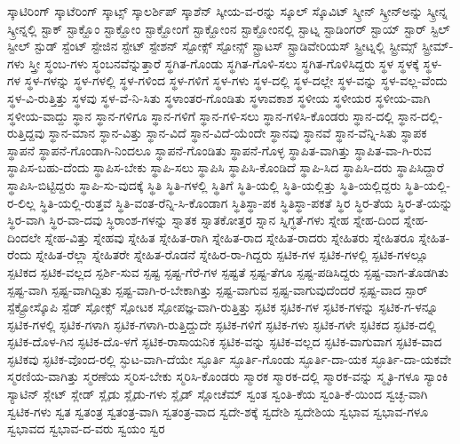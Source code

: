 {ಸ್ಕಾಟಿರಿಂಗ್
ಸ್ಕಾಟೆರಿಂಗ್
ಸ್ಕಾಟ್ಸ್
ಸ್ಕಾಲರ್ಶಿಪ್
ಸ್ಕಾಶೆನ್
ಸ್ಕೀಯ-ವ-ರನ್ನು
ಸ್ಕೂಲ್
ಸ್ಕೊವಿಟ್
ಸ್ಕ್ರೀನ್
ಸ್ಕ್ರೀನ್ಅನ್ನು
ಸ್ಕ್ರೀನ್ನ
ಸ್ಕ್ರೀನ್ನಲ್ಲಿ
ಸ್ಟಾಕ್
ಸ್ಟಾಕ್ಹೊಂ
ಸ್ಟಾಕ್ಹೋಂ
ಸ್ಟಾಕ್ಹೋಂಗೆ
ಸ್ಟಾಕ್ಹೋಂನ
ಸ್ಟಾಕ್ಹೋಂನಲ್ಲಿ
ಸ್ಟಾಟ್ನ
ಸ್ಟಾಡಿಂಗರ್
ಸ್ಟಾಯ್
ಸ್ಟಾರ್
ಸ್ಟಿಲ್
ಸ್ಟೀಲ್
ಸ್ಟುಡ್
ಸ್ಟೆಂಟ್
ಸ್ಟೇಜಿನ
ಸ್ಟೇಟ್
ಸ್ಟೇಶನ್
ಸ್ಟೋಕ್ಸ್
ಸ್ಟೋನ್ಸ್
ಸ್ಟ್ರಾಟಸ್
ಸ್ಟ್ರಾಡಿವೇರಿಯಸ್
ಸ್ಟ್ರೀಟ್ನಲ್ಲಿ
ಸ್ಟ್ರೀಮ್ಸ್
ಸ್ಟ್ರೀಮ್-ಗಳು
ಸ್ತ್ರೀ
ಸ್ಥಂಬ-ಗಳು
ಸ್ಥಂಬನವೆನ್ನುತ್ತಾರೆ
ಸ್ಥಗಿತ-ಗೊಂಡು
ಸ್ಥಗಿತ-ಗೊಳಿ-ಸಲು
ಸ್ಥಗಿತ-ಗೊಳಿಸಿದ್ದರು
ಸ್ಥಳ
ಸ್ಥಳಕ್ಕೆ
ಸ್ಥಳ-ಗಳ
ಸ್ಥಳ-ಗಳನ್ನು
ಸ್ಥಳ-ಗಳಲ್ಲಿ
ಸ್ಥಳ-ಗಳಿಂದ
ಸ್ಥಳ-ಗಳಿಗೆ
ಸ್ಥಳ-ಗಳು
ಸ್ಥಳ-ದಲ್ಲಿ
ಸ್ಥಳ-ದಲ್ಲೇ
ಸ್ಥಳ-ವನ್ನು
ಸ್ಥಳ-ವಲ್ಲ-ವೆಂದು
ಸ್ಥಳ-ವಿ-ರುತ್ತಿತ್ತು
ಸ್ಥಳವು
ಸ್ಥಳ-ವೆ-ನಿ-ಸಿತು
ಸ್ಥಳಾಂತರ-ಗೊಂಡಿತು
ಸ್ಥಳಾವಕಾಶ
ಸ್ಥಳೀಯ
ಸ್ಥಳೀಯರ
ಸ್ಥಳೀಯ-ವಾಗಿ
ಸ್ಥಳೀಯ-ವಾದ್ದು
ಸ್ಥಾನ
ಸ್ಥಾನ-ಗಳಿಗೂ
ಸ್ಥಾನ-ಗಳಿಗೆ
ಸ್ಥಾನ-ಗಳಿ-ಸಲು
ಸ್ಥಾನ-ಗಳಿಸಿ-ಕೊಂಡರು
ಸ್ಥಾನ-ದಲ್ಲಿ
ಸ್ಥಾನ-ದಲ್ಲಿ-ರುತ್ತಿದ್ದವು
ಸ್ಥಾನ-ಮಾನ
ಸ್ಥಾನ-ವಿತ್ತು
ಸ್ಥಾನ-ವಿದೆ
ಸ್ಥಾನ-ವಿದೆ-ಯೆಂದೇ
ಸ್ಥಾನವು
ಸ್ಥಾನವೆ
ಸ್ಥಾನ-ವೆನ್ನಿ-ಸಿತು
ಸ್ಥಾಪಕ
ಸ್ಥಾಪನೆ
ಸ್ಥಾಪನೆ-ಗೊಂಡಾಗಿ-ನಿಂದಲೂ
ಸ್ಥಾಪನೆ-ಗೊಂಡಿತು
ಸ್ಥಾಪನೆ-ಗೊಳ್ಳ
ಸ್ಥಾಪಿತ-ವಾಗಿತ್ತು
ಸ್ಥಾಪಿತ-ವಾ-ಗಿ-ರುವ
ಸ್ಥಾಪಿಸ-ಬಹು-ದೆಂದು
ಸ್ಥಾಪಿಸ-ಬೇಕು
ಸ್ಥಾಪಿ-ಸಲು
ಸ್ಥಾಪಿಸಿ
ಸ್ಥಾಪಿಸಿ-ಕೊಂಡಿದೆ
ಸ್ಥಾಪಿ-ಸಿದ
ಸ್ಥಾಪಿಸಿ-ದರು
ಸ್ಥಾಪಿಸಿದ್ದಾರೆ
ಸ್ಥಾಪಿಸಿ-ಬಿಟ್ಟಿದ್ದರು
ಸ್ಥಾಪಿ-ಸು-ವುದಕ್ಕೆ
ಸ್ಥಿತಿ
ಸ್ಥಿತಿ-ಗಳಲ್ಲಿ
ಸ್ಥಿತಿಗೆ
ಸ್ಥಿತಿ-ಯಲ್ಲಿ
ಸ್ಥಿತಿ-ಯಲ್ಲಿತ್ತು
ಸ್ಥಿತಿ-ಯಲ್ಲಿದ್ದರು
ಸ್ಥಿತಿ-ಯಲ್ಲಿ-ರ-ಲಿಲ್ಲ
ಸ್ಥಿತಿ-ಯಲ್ಲಿ-ರುತ್ತವೆ
ಸ್ಥಿತಿ-ವಂತ-ರೆನ್ನಿ-ಸಿ-ಕೊಂಡಾಗ
ಸ್ಥಿತಿಸ್ಥಾ-ಪಕ
ಸ್ಥಿತಿಸ್ಥಾ-ಪಕತೆ
ಸ್ಥಿರ
ಸ್ಥಿರ-ತೆಯ
ಸ್ಥಿರ-ತೆ-ಯನ್ನು
ಸ್ಥಿರ-ವಾಗಿ
ಸ್ಥಿರ-ವಾ-ದವು
ಸ್ಥಿರಾಂಶ-ಗಳನ್ನು
ಸ್ನಾತಕ
ಸ್ನಾತಕೋತ್ತರ
ಸ್ನಾನ
ಸ್ನಿಗ್ಧತೆ-ಗಳು
ಸ್ನೇಹ
ಸ್ನೇಹ-ದಿಂದ
ಸ್ನೇಹ-ದಿಂದಲೇ
ಸ್ನೇಹ-ವಿತ್ತು
ಸ್ನೇಹವು
ಸ್ನೇಹಿತ
ಸ್ನೇಹಿತ-ರಾಗಿ
ಸ್ನೇಹಿತ-ರಾದ
ಸ್ನೇಹಿತ-ರಾದರು
ಸ್ನೇಹಿತರು
ಸ್ನೇಹಿತರೂ
ಸ್ನೇಹಿತ-ರೆಂದು
ಸ್ನೇಹಿತ-ರೆಲ್ಲಾ
ಸ್ನೇಹಿತರೇ
ಸ್ನೇಹಿತ-ರೊಡನೆ
ಸ್ನೇಹಿರ-ರಾ-ಗಿದ್ದರು
ಸ್ಪಟಿಕ-ಗಳ
ಸ್ಪಟಿಕ-ಗಳಲ್ಲಿ
ಸ್ಪಟಿಕ-ಗಳಲ್ಲೂ
ಸ್ಪಟಿಕದ
ಸ್ಪಟಿಕ-ವಲ್ಲದ
ಸ್ಪರ್ಶಿ-ಸುವ
ಸ್ಪಷ್ಟ
ಸ್ಪಷ್ಟ-ಗೆರೆ-ಗಳ
ಸ್ಪಷ್ಟತೆ
ಸ್ಪಷ್ಟ-ತೆಗೂ
ಸ್ಪಷ್ಟ-ಪಡಿಸಿದ್ದರು
ಸ್ಪಷ್ಟ-ವಾಗ-ತೊಡಗಿತು
ಸ್ಪಷ್ಟ-ವಾಗಿ
ಸ್ಪಷ್ಟ-ವಾಗಿದ್ದಿತು
ಸ್ಪಷ್ಟ-ವಾಗಿ-ರ-ಬೇಕಾಗಿತ್ತು
ಸ್ಪಷ್ಟ-ವಾಗುವ
ಸ್ಪಷ್ಟ-ವಾಗುವುದೆಂದರೆ
ಸ್ಪಷ್ಟ-ವಾದ
ಸ್ಪಾರ್
ಸ್ಪೆಕ್ಟ್ರೋಸ್ಕೊಪಿ
ಸ್ಪೆಡ್
ಸ್ಪೋಕ್ಸ್
ಸ್ಪೋಟಕ
ಸ್ಪೋಪಜ್ಞ-ವಾಗಿ-ರುತ್ತಿತ್ತು
ಸ್ಫಟಿಕ
ಸ್ಫಟಿಕ-ಗಳ
ಸ್ಫಟಿಕ-ಗಳನ್ನು
ಸ್ಫಟಿಕ-ಗ-ಳನ್ನೂ
ಸ್ಫಟಿಕ-ಗಳಲ್ಲಿ
ಸ್ಫಟಿಕ-ಗಳಾಗಿ
ಸ್ಫಟಿಕ-ಗಳಾಗಿ-ರುತ್ತಿದ್ದುದೇ
ಸ್ಫಟಿಕ-ಗಳಿಗೆ
ಸ್ಫಟಿಕ-ಗಳು
ಸ್ಫಟಿಕ-ಗಳೇ
ಸ್ಫಟಿಕದ
ಸ್ಫಟಿಕ-ದಲ್ಲಿ
ಸ್ಫಟಿಕ-ದೊಳ-ಗಿನ
ಸ್ಫಟಿಕ-ದೊ-ಳಗೆ
ಸ್ಫಟಿಕ-ರಾಸಾಯನಿಕ
ಸ್ಫಟಿಕ-ವನ್ನು
ಸ್ಫಟಿಕ-ವಲ್ಲದ
ಸ್ಫಟಿಕ-ವಾಗುವಾಗ
ಸ್ಫಟಿಕ-ವಾದ
ಸ್ಫಟಿಕವು
ಸ್ಫಟಿಕ-ವೊಂದ-ರಲ್ಲಿ
ಸ್ಫುಟ-ವಾಗಿ-ದೆಯೇ
ಸ್ಫೂರ್ತಿ
ಸ್ಫೂರ್ತಿ-ಗೊಂಡು
ಸ್ಫೂರ್ತಿ-ದಾ-ಯಕ
ಸ್ಫೂರ್ತಿ-ದಾ-ಯಕವೇ
ಸ್ಮರಣಿಯ-ವಾಗಿತ್ತು
ಸ್ಮರಣೆಯ
ಸ್ಮರಿಸ-ಬೇಕು
ಸ್ಮರಿಸಿ-ಕೊಂಡರು
ಸ್ಮಾರಕ
ಸ್ಮಾರಕ-ದಲ್ಲಿ
ಸ್ಮಾರಕ-ವನ್ನು
ಸ್ಮೃತಿ-ಗಳೂ
ಸ್ಯಾಂಕಿ
ಸ್ಯಾಟಿನ್
ಸ್ಲೇಟ್
ಸ್ಲೇಡ್
ಸ್ಲೈಡು
ಸ್ಲೈಡು-ಗಳು
ಸ್ಲೈಡ್
ಸ್ಲೋಚೆಮ್
ಸ್ವಂತ
ಸ್ವಂತಿ-ಕೆಯ
ಸ್ವಂತಿ-ಕೆ-ಯಿಂದ
ಸ್ವಚ್ಛ-ವಾಗಿ
ಸ್ವಟಿಕ-ಗಳು
ಸ್ವತ
ಸ್ವತಂತ್ರ
ಸ್ವತಂತ್ರ-ವಾಗಿ
ಸ್ವತಂತ್ರ-ವಾದ
ಸ್ವದೇ-ಶಕ್ಕೆ
ಸ್ವದೇಶಿ
ಸ್ವದೇಶಿಯ
ಸ್ವಭಾವ
ಸ್ವಭಾವ-ಗಳೂ
ಸ್ವಭಾವದ
ಸ್ವಭಾವ-ದ-ವರು
ಸ್ವಯಂ
ಸ್ವರ
}
